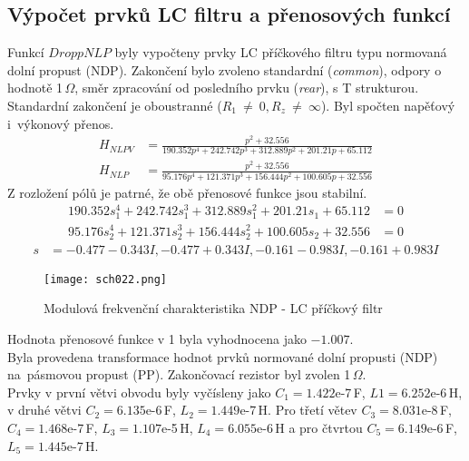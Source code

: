\subsection{Výpočet prvků LC filtru a přenosových funkcí}\label{s:VYP}
\noindent Funkcí $DroppNLP$ byly vypočteny prvky LC příčkového filtru typu normovaná dolní propust (NDP). Zakončení bylo zvoleno standardní (\textit{common}), odpory o hodnotě 1\,$\Omega$, směr zpracování od posledního prvku (\textit{rear}), s T strukturou. Standardní zakončení je oboustranné ($R_1~\neq~0, R_z~\neq~\infty$).
\noindent Byl spočten  napěťový i~výkonový přenos.
\begin{align}
H_{NLPV} &= \frac{p^2  + 32.556}{190.352p^4  + 242.742p^3  + 312.889p^2  + 201.21p + 65.112}\\
H_{NLP} &= \frac{p^2  + 32.556}{95.176p^4 + 121.371p^3 + 156.444p^2 + 100.605p + 32.556}
\end{align}
\noindent Z rozložení pólů je patrné, že obě přenosové funkce jsou stabilní.
\begin{align}
190.352s_1^4 + 242.742s_1^3 + 312.889s_1^2 + 201.21s_1 + 65.112 &= 0 \\
95.176s_2^4 + 121.371s_2^3 + 156.444s_2^2 + 100.605s_2 + 32.556 &= 0
\end{align}
\begin{align}
s &= {-0.477 - 0.343 I}, {-0.477 + 0.343 I}, {-0.161 - 0.983 I}, {-0.161 + 0.983 I}
\end{align}
\begin{figure}[h]
\centering
\texttt{[image: sch022.png]}
\caption{Modulová frekvenční charakteristika NDP - LC příčkový filtr}
\end{figure}
\noindent Hodnota přenosové funkce v 1 byla vyhodnocena jako $-1.007$.\\
\noindent Byla provedena transformace hodnot prvků normované dolní propusti (NDP) na~pásmovou propust (PP). Zakončovací rezistor byl zvolen 1\,$\Omega$.\\
Prvky v první větvi obvodu byly vyčísleny jako $C_1 = 1.422$e-7\,F, $L1 = 6.252$e-6\,H, v druhé větvi $C_2 = 6.135$e-6\,F, $L_2 = 1.449$e-7\,H. Pro třetí větev $C_3 = 8.031$e-8\,F, $C_4 = 1.468$e-7\,F, $L_3 = 1.107$e-5\,H, $L_4 = 6.055$e-6\,H a pro čtvrtou $C_5 = 6.149$e-6\,F, $L_5 = 1.445$e-7\,H.\\

